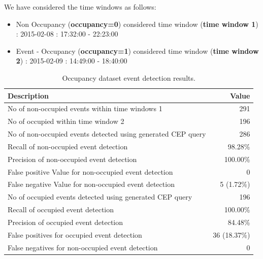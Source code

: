 \documentclass[conference]{IEEEtran}  %
\begin{document}
We have considered the time windows as follows:
\begin{itemize}
\item Non Occupancy (\textbf{occupancy=0}) considered time window (\textbf{time window 1}) : 2015-02-08 : 17:32:00 - 22:23:00
\item Event - Occupancy (\textbf{occupancy=1}) considered time window (\textbf{time window 2}) : 2015-02-09 : 14:49:00 - 18:40:00
\end{itemize}

\begin{table}
\begin{center}
\caption{Occupancy dataset event detection results.}
\begin{tabular}{ | m{6cm} | m{2.3cm}| } 
 \hline 
\textbf{Description} & \multicolumn{1}{|r|}{\textbf{Value}}\\
\hline
No of non-occupied events within time windows 1 & \multicolumn{1}{|r|}{291}\\
\hline
No of occupied within time window 2 & \multicolumn{1}{|r|}{196} \\
\hline
No of non-occupied events detected using generated CEP query & \multicolumn{1}{|r|}{286}\\
\hline
Recall of non-occupied event detection & \multicolumn{1}{|r|}{98.28\%}\\
\hline
Precision of non-occupied event detection & \multicolumn{1}{|r|}{100.00\%}\\
\hline
False positive Value for non-occupied event detection & \multicolumn{1}{|r|}{0}\\
\hline
False negative Value for non-occupied event detection & \multicolumn{1}{|r|}{5 (1.72\%)}\\
\hline
No of occupied events detected using generated CEP query & \multicolumn{1}{|r|}{196}\\ 
 \hline
Recall of occupied event detection & \multicolumn{1}{|r|}{100.00\%}\\
\hline
Precision of occupied event detection & \multicolumn{1}{|r|}{84.48\%}\\
\hline
False positives for occupied event detection & \multicolumn{1}{|r|}{36 (18.37\%)}\\
\hline
False negatives for non-occupied event detection & \multicolumn{1}{|r|}{0}\\
\hline

\end{tabular}
\end{center}
\end{table}
\end{document}
